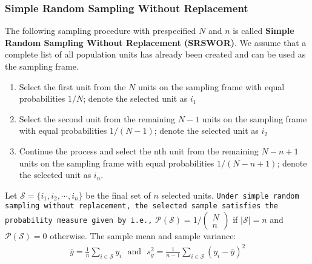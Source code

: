 \documentclass[a4paper,twoside,11pt]{article}
\begin{document}
{\subsubsection{Simple Random Sampling Without Replacement}
The following sampling procedure with prespecified $N$ and $n$ is called \textbf{Simple Random Sampling Without Replacement (SRSWOR)}. We assume that a complete list of all population units has already been created and can be used as the sampling frame.
\begin{enumerate}
    \item Select the first unit from the $N$ units on the sampling frame with equal probabilities $1/N$; denote the selected unit as $i_1$
    \item Select the second unit from the remaining $N-1$ units on the sampling frame with equal probabilities $1/(N-1)$; denote the selected unit as $i_2$
    \item Continue the process and select the nth unit from the remaining $N-n + 1$ units on the sampling frame with equal probabilities $1/(N-n+1)$; denote the selected unit as $i_n$.
\end{enumerate}
Let $\mathcal{S} = \{ i_1, i_2, \cdots, i_n \}$ be the final set of $n$ selected units. 
\newline
\newline
\texttt{Under simple random sampling without replacement, the selected sample satisfies the \\ probability measure given by i.e.,} $\mathcal{P(S)} = 1/ \begin{pmatrix}  N \\ n \end{pmatrix}$ if $|\mathcal{S}| =n$ and $\mathcal{P(S)} = 0$ otherwise.
\newline
The sample mean and sample variance:
\begin{equation*}
\begin{aligned}
\bar{y} = \frac{1}{n}\sum_{i \in \mathcal{S}} y_i \ \ \ \text{and} \ \ \ s_y^2 = \frac{1}{n-1} \sum_{i \in \mathcal{S}} (y_i - \bar{y})^2
\end{aligned}
\end{equation*}
}
\end{document}
